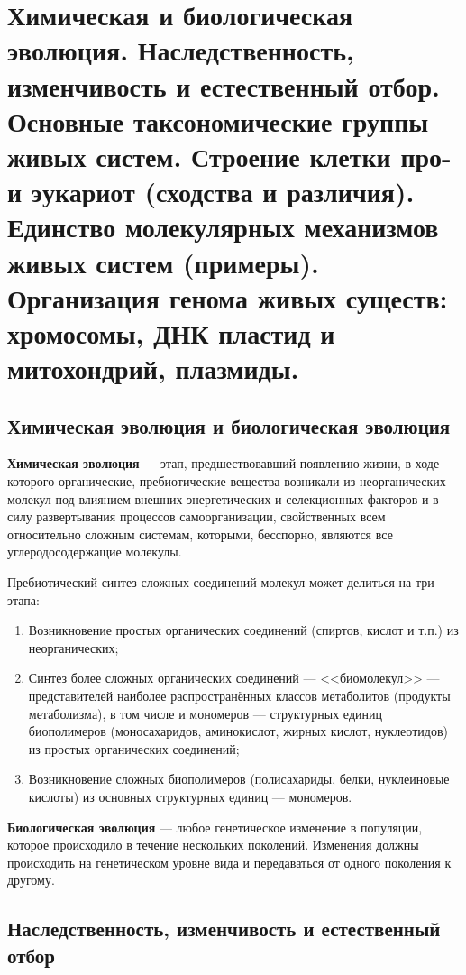 \section{Химическая и биологическая эволюция. Наследственность, изменчивость и естественный отбор. Основные таксономические группы живых систем. Строение клетки про- и эукариот (сходства и различия). Единство молекулярных механизмов живых систем (примеры). Организация генома живых существ: хромосомы, ДНК пластид и митохондрий, плазмиды.}

\subsection{Химическая эволюция и биологическая эволюция}

\textbf{Химическая эволюция} --- этап, предшествовавший появлению жизни, в ходе которого органические, пребиотические вещества возникали из неорганических молекул под влиянием внешних энергетических и селекционных факторов и в силу развертывания процессов самоорганизации, свойственных всем относительно сложным системам, которыми, бесспорно, являются все углеродосодержащие молекулы.

\medspace

Пребиотический синтез сложных соединений молекул может делиться на три этапа:

\begin{enumerate}
	\item Возникновение простых органических соединений (спиртов, кислот и т.п.) из неорганических;
	
	\item Синтез более сложных органических соединений — <<биомолекул>> — представителей наиболее распространённых классов метаболитов (продукты метаболизма), в том числе и мономеров --- структурных единиц биополимеров (моносахаридов, аминокислот, жирных кислот, нуклеотидов) из простых органических соединений;
	
	\item Возникновение сложных биополимеров (полисахариды, белки, нуклеиновые кислоты) из основных структурных единиц --- мономеров.
\end{enumerate}

\textbf{Биологическая эволюция} --- любое генетическое изменение в популяции, которое происходило в течение нескольких поколений. Изменения должны происходить на генетическом уровне вида и передаваться от одного поколения к другому.

\subsection{Наследственность, изменчивость и естественный отбор}

